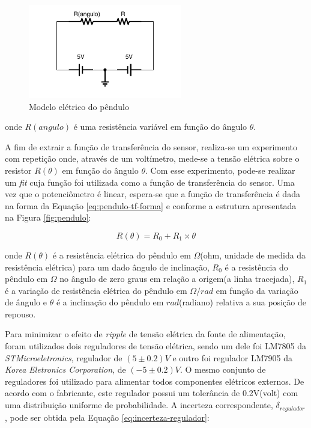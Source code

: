\documentclass[a4paper]{instrumentacao}
\begin{document}
\begin{figure}[H]
\centering
\includegraphics[width=0.6\textwidth]{Pendulo-Circuito.pdf}
\caption{Modelo elétrico do pêndulo}
\label{fig:pendulo-equivalente}
\end{figure}

\noindent
onde $R(angulo)$ é uma resistência variável em função do ângulo $\theta$.

A fim de extrair a função de transferência do sensor, realiza-se um experimento com repetição onde, através de um voltímetro, mede-se a tensão elétrica sobre o resistor $R(\theta)$ em função do ângulo $\theta$. Com esse experimento, pode-se realizar um \textit{fit} cuja função foi utilizada como a função de transferência do sensor. Uma vez que o potenciômetro é linear, espera-se que a função de transferência é dada na forma da Equação \ref{eq:pendulo-tf-forma} e conforme a estrutura apresentada na Figura \ref{fig:pendulo}:

\begin{equation}
	R(\theta) = R_0 + R_1 \times \theta
	\label{eq:pendulo-tf-forma}
\end{equation}

\noindent
onde $R(\theta)$ é a resistência elétrica do pêndulo em $\Omega$(ohm, unidade de medida da resistência elétrica) para um dado ângulo de inclinação, $R_0$ é a resistência do pêndulo em $\Omega$ no ângulo de zero graus em relação a origem(a linha tracejada), $R_1$ é a variação de resistência elétrica do pêndulo em $\Omega / rad$ em função da variação de ângulo e $\theta$ é a inclinação do pêndulo em $rad$(radiano) relativa a sua posição de repouso.

Para minimizar o efeito de \textit{ripple} de tensão elétrica da fonte de alimentação, foram utilizados dois reguladores de tensão elétrica, sendo um dele foi LM7805 da \textit{STMicroeletronics}, regulador de $(5 \pm 0.2)V$\cite{datasheet-lm7805} e outro foi regulador LM7905 da \textit{Korea Eletronics Corporation}, de $(-5 \pm 0.2)V$\cite{datasheet-lm7905}. O mesmo conjunto de reguladores foi utilizado para alimentar todos componentes elétricos externos. De acordo com o fabricante, este regulador possui um tolerância de 0.2V(volt) com uma distribuição uniforme de probabilidade. A incerteza correspondente, $\delta_{regulador}$, pode ser obtida pela Equação \ref{eq:incerteza-regulador}:
\end{document}
